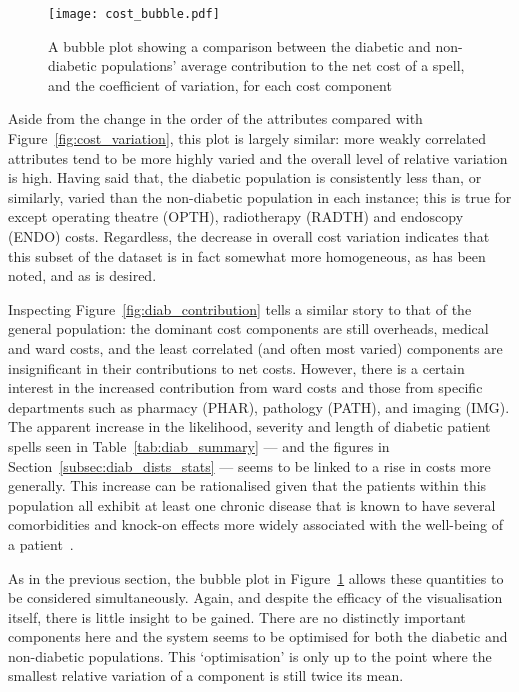\begin{figure}
    \centering
    \texttt{[image: cost\_bubble.pdf]}
    \caption{%
        A bubble plot showing a comparison between the diabetic and
        non-diabetic populations' average contribution to the net cost of a
        spell, and the coefficient of variation, for each cost component
    }\label{fig:diab_bubble}
\end{figure}

Aside from the change in the order of the attributes compared with
Figure~\ref{fig:cost_variation}, this plot is largely similar: more weakly
correlated attributes tend to be more highly varied and the overall level of
relative variation is high. Having said that, the diabetic population is
consistently less than, or similarly, varied than the non-diabetic population in
each instance; this is true for except operating theatre (OPTH), radiotherapy
(RADTH) and endoscopy (ENDO) costs. Regardless, the decrease in overall cost
variation indicates that this subset of the dataset is in fact somewhat more
homogeneous, as has been noted, and as is desired.

Inspecting Figure~\ref{fig:diab_contribution} tells a similar story to that of
the general population: the dominant cost components are still overheads,
medical and ward costs, and the least correlated (and often most varied)
components are insignificant in their contributions to net costs. However, there
is a certain interest in the increased contribution from ward costs and those
from specific departments such as pharmacy (PHAR), pathology (PATH), and imaging
(IMG). The apparent increase in the likelihood, severity and length of diabetic
patient spells seen in Table~\ref{tab:diab_summary} --- and the figures in
Section~\ref{subsec:diab_dists_stats} --- seems to be linked to a rise in costs
more generally. This increase can be rationalised given that the patients within
this population all exhibit at least one chronic disease that is known to have
several comorbidities and knock-on effects more widely associated with the
well-being of a patient~\cite{Deschenes2015,Klimek2015,Walker2016}.

As in the previous section, the bubble plot in Figure~\ref{fig:diab_bubble}
allows these quantities to be considered simultaneously. Again, and despite the
efficacy of the visualisation itself, there is little insight to be gained.
There are no distinctly important components here and the system seems to be
optimised for both the diabetic and non-diabetic populations. This
`optimisation' is only up to the point where the smallest relative variation of
a component is still twice its mean.


